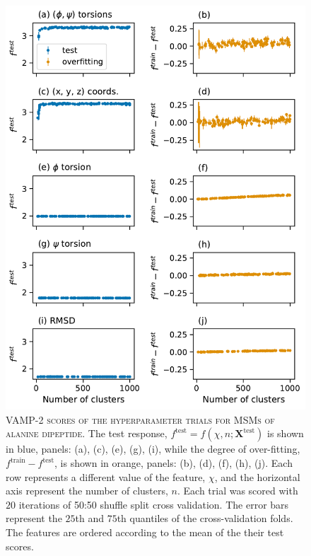 \begin{figure}[p]
    \centering
    \includegraphics[height=0.8\textheight]{chapters/msm_optimization/figures/ala1_train_test_results.pdf}
    \caption[VAMP-2 scores of the hyperparameter trials for MSMs of alanine dipeptide]{\textsc{VAMP-2 scores of the hyperparameter trials for MSMs of alanine dipeptide}. The test response, $f^{\mathrm{test}} = f(\chi, n; \mathbf{X}^{\mathrm{test}})$ is shown in blue, panels: (a), (c), (e), (g), (i),  while the degree of over-fitting, $f^{\mathrm{train}} - f^{\mathrm{test}}$, is shown in orange, panels: (b), (d), (f), (h), (j). Each row represents a different value of the feature, $\chi$, and the horizontal axis represent the number of clusters, $n$. Each trial was scored with $20$ iterations of 50:50 shuffle split cross validation. The error bars represent the $25$th and $75$th quantiles of the cross-validation folds. 
    The features are ordered according to the mean of the their test scores.}
    \label{fig:ala1_train_test}
\end{figure}



